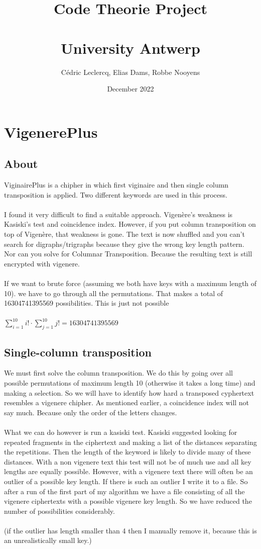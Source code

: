 \documentclass{article}
\title{Code Theorie Project\\\\ University Antwerp}
\author{Cédric Leclercq, Elias Dams, Robbe Nooyens}
\date{December 2022}
\begin{document}
\maketitle

\tableofcontents

\newpage

\section{VigenerePlus}
\subsection{About}
ViginairePlus is a chipher in which first viginaire and then single column transposition is applied. Two different keywords are used in this process.\\
\\
I found it very difficult to find a suitable approach. Vigenère's weakness is Kasiski's test and coincidence index. However, if you put column transposition on top of Vigenère, that weakness is gone. The text is now shuffled and you can't search for digraphs/trigraphs because they give the wrong key length pattern. Nor can you solve for Columnar Transposition. Because the resulting text is still encrypted with vigenere.\\
\\
If we want to brute force (assuming we both have keys with a maximum length of 10). we have to go through all the permutations. That makes a total of 16304741395569 possibilities. This is just not possible\\
\\
$\sum_{i=1}^{10} i! \cdot \sum_{j=1}^{10} j! = 16304741395569$\\
\subsection{Single-column transposition}
We must first solve the column transposition. We do this by going over all possible permutations of maximum length 10 (otherwise it takes a long time) and making a selection. So we will have to identify how hard a transposed cyphertext resembles a vigenere chipher. As mentioned earlier, a coincidence index will not say much. Because only the order of the letters changes.\\
\\
What we can do however is run a kasiski test. Kasiski suggested looking for repeated fragments in the ciphertext and making a list of the distances separating the repetitions. Then the length of the keyword is likely to divide many of these distances. With a non vigenere text this test will not be of much use and all key lengths are equally possible. However, with a vigenere text there will often be an outlier of a possible key length. If there is such an outlier I write it to a file. So after a run of the first part of my algorithm we have a file consisting of all the vigenere ciphertexts with a possible vigenere key length. So we have reduced the number of possibilities considerably.\\
\\
(if the outlier has length smaller than 4 then I manually remove it, because this is an unrealistically small key.)
\newpage
\end{document}
